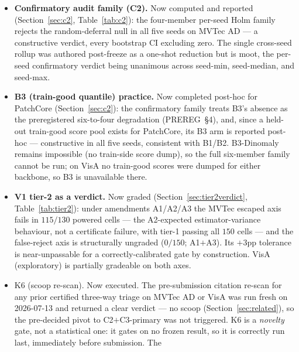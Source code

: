 \documentclass[11pt]{article}
\begin{document}
\begin{itemize}
  \item \textbf{Confirmatory audit family (C2).} Now computed and reported
        (Section~\ref{sec:c2}, Table~\ref{tab:c2}): the four-member per-seed Holm family rejects the
        random-deferral null in all five seeds on MVTec AD --- a constructive verdict, every
        bootstrap CI excluding zero. The single cross-seed rollup was authored post-freeze as a
        one-shot reduction but is moot, the per-seed confirmatory verdict being unanimous across
        seed-min, seed-median, and seed-max.
  \item \textbf{B3 (train-good quantile) practice.} Now completed post-hoc for PatchCore
        (Section~\ref{sec:c2}): the confirmatory family treats B3's absence as the preregistered
        six-to-four degradation (PREREG~\S4), and, since a held-out train-good score pool exists for
        PatchCore, its B3 arm is reported post-hoc --- constructive in all five seeds, consistent
        with B1/B2. B3-Dinomaly remains impossible (no train-side score dump), so the full
        six-member family cannot be run; on VisA no train-good scores were dumped for either
        backbone, so B3 is unavailable there.
  \item \textbf{V1 tier-2 as a verdict.} Now graded (Section~\ref{sec:tier2verdict},
        Table~\ref{tab:tier2}): under amendments A1/A2/A3 the MVTec escaped axis fails in $115/130$
        powered cells --- the A2-expected estimator-variance behaviour, not a certificate failure,
        with tier-1 passing all $150$ cells --- and the false-reject axis is structurally ungraded
        ($0/150$; A1$+$A3). Its $+3$pp tolerance is near-unpassable for a correctly-calibrated gate
        by construction. VisA (exploratory) is partially gradeable on both axes.
  \item K6 (scoop re-scan). Now executed. The pre-submission citation re-scan for any prior
        certified three-way triage on MVTec AD or VisA was run fresh on 2026-07-13 and returned a
        clear verdict --- no scoop (Section~\ref{sec:related}), so the pre-decided pivot to
        C2$+$C3-primary was not triggered. K6 is a \emph{novelty} gate, not a statistical one: it
        gates on no frozen result, so it is correctly run last, immediately before submission. The

\end{itemize}
\end{document}

